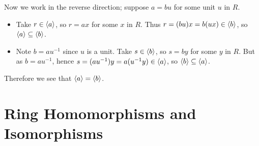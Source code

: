 \begin{questions}
    Now we work in the reverse direction; suppose $a = bu$ for some unit $u$ in $R$.
    \begin{itemize}
        \item Take $r \in \left\langle a\right\rangle$, so $r = ax$ for some $x$ in $R$. Thus $r = (bu)x = b(ux) \in \left\langle b\right\rangle$, so $\left\langle a\right\rangle \subseteq \left\langle b\right\rangle$.
        \item Note $b = au^{-1}$ since $u$ is a unit. Take $s \in \left\langle b\right\rangle$, so $s = by$ for some $y$ in $R$. But as $b = au^{-1}$, hence $s = (au^{-1})y = a(u^{-1}y) \in \left\langle a\right\rangle$, so $\left\langle b\right\rangle \subseteq \left\langle a\right\rangle$.
    \end{itemize}
    Therefore we see that $\left\langle a\right\rangle = \left\langle b\right\rangle$.
\end{questions}

\section{Ring Homomorphisms and Isomorphisms}
